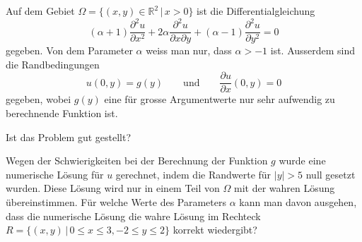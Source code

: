 Auf dem Gebiet $\Omega=\{(x,y)\in\mathbb R^2\,|\, x>0\}$ ist die
Differentialgleichung
\begin{equation}
(\alpha + 1) \frac{\partial^2 u}{\partial x^2}
+
2\alpha\frac{\partial^2 u}{\partial x\partial y}
+
(\alpha - 1)\frac{\partial^2 u}{\partial y^2}
=
0
\label{90000014:dgl}
\end{equation}
gegeben.
Von dem Parameter $\alpha$ weiss man nur, dass $\alpha > -1$ ist.
Ausserdem sind die Randbedingungen
\[
u(0,y)=g(y)\qquad\text{und}\qquad \frac{\partial u}{\partial x}(0,y)=0
\]
gegeben, wobei $g(y)$ eine für grosse Argumentwerte nur sehr aufwendig zu
berechnende Funktion ist.
\begin{teilaufgaben}
\item
Ist das Problem gut gestellt?
\item
Wegen der Schwierigkeiten bei der Berechnung der Funktion $g$
wurde eine numerische Lösung für $u$ gerechnet, indem die
Randwerte für $|y|>5$ null gesetzt wurden.
Diese Lösung wird nur in einem Teil von $\Omega$ mit der wahren Lösung
übereinstimmen.
Für welche Werte des Parameters $\alpha$ kann man davon ausgehen, dass die
numerische Lösung die wahre Lösung im Rechteck
$R=\{(x,y)\,|\, 0\le x\le 3,-2\le y\le 2\}$ korrekt
wiedergibt?
\end{teilaufgaben}


